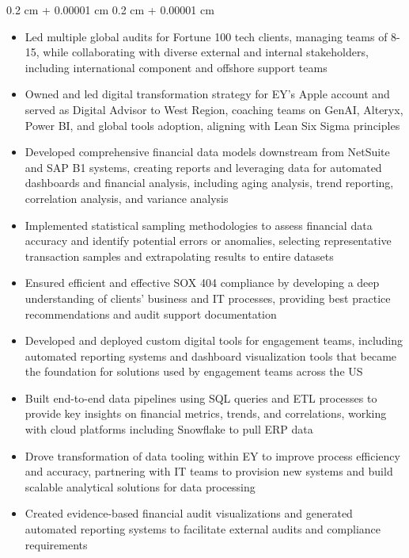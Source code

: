 \documentclass[10pt, letterpaper]{article}
\newenvironment{highlights}{
    \begin{itemize}[
        topsep=0.10 cm,
        parsep=0.10 cm,
        partopsep=0pt,
        itemsep=0pt,
        leftmargin=0.4 cm + 10pt
    ]
}{
    \end{itemize}
} %
\newenvironment{onecolentry}{
    \begin{adjustwidth}{
        0.2 cm + 0.00001 cm
    }{
        0.2 cm + 0.00001 cm
    }
}{
    \end{adjustwidth}
} %
\begin{document}
        \begin{onecolentry}
            \begin{highlights}
                \item Led multiple global audits for Fortune 100 tech clients, managing teams of 8-15, while collaborating with diverse external and internal stakeholders, including international component and offshore support teams
                \item Owned and led digital transformation strategy for EY's Apple account and served as Digital Advisor to West Region, coaching teams on GenAI, Alteryx, Power BI, and global tools adoption, aligning with Lean Six Sigma principles
                \item Developed comprehensive financial data models downstream from NetSuite and SAP B1 systems, creating reports and leveraging data for automated dashboards and financial analysis, including aging analysis, trend reporting, correlation analysis, and variance analysis
                \item Implemented statistical sampling methodologies to assess financial data accuracy and identify potential errors or anomalies, selecting representative transaction samples and extrapolating results to entire datasets
                \item Ensured efficient and effective SOX 404 compliance by developing a deep understanding of clients' business and IT processes, providing best practice recommendations and audit support documentation
                \item Developed and deployed custom digital tools for engagement teams, including automated reporting systems and dashboard visualization tools that became the foundation for solutions used by engagement teams across the US
                \item Built end-to-end data pipelines using SQL queries and ETL processes to provide key insights on financial metrics, trends, and correlations, working with cloud platforms including Snowflake to pull ERP data
                \item Drove transformation of data tooling within EY to improve process efficiency and accuracy, partnering with IT teams to provision new systems and build scalable analytical solutions for data processing
                \item Created evidence-based financial audit visualizations and generated automated reporting systems to facilitate external audits and compliance requirements

\end{highlights}
\end{onecolentry}
\end{document}
